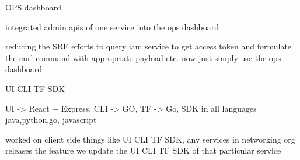 \documentclass[]{deedy-resume-reversed}
\begin{document}
\begin{minipage}[t]{0.60\textwidth}
\begin{tightemize}
\item OPS dashboard
\item integrated admin apis of one service into the ops dashboard
\item reducing the SRE efforts to query iam service to get access token and formulate the curl command with appropriate payload etc. now just simply use the ops dashboard
\item UI CLI TF SDK
\item UI -> React + Express, CLI -> GO, TF -> Go, SDK in all languages java,python,go, javascript
\item worked on client side things like UI CLI TF SDK, any services in networking org releases the feature we update the UI CLI TF SDK of that particular service


\end{tightemize}
\sectionsep


\end{minipage}
\end{document}
